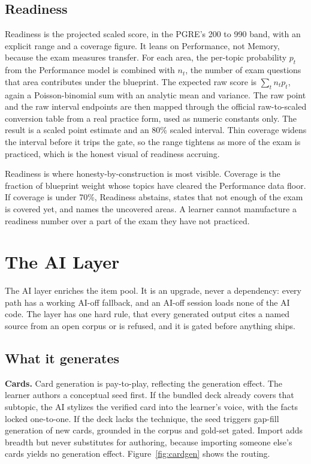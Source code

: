 \documentclass[11pt]{article}
\begin{document}
\subsection{Readiness}

Readiness is the projected scaled score, in the PGRE's 200 to 990 band, with an
explicit range and a coverage figure. It leans on Performance, not Memory, because
the exam measures transfer. For each area, the per-topic probability $p_t$ from the
Performance model is combined with $n_t$, the number of exam questions that area
contributes under the blueprint. The expected raw score is $\sum_t n_t p_t$, again a
Poisson-binomial sum with an analytic mean and variance. The raw point and the raw
interval endpoints are then mapped through the official raw-to-scaled conversion table
from a real practice form, used as numeric constants only. The result is a scaled
point estimate and an 80\% scaled interval. Thin coverage widens the interval before it
trips the gate, so the range tightens as more of the exam is practiced, which is the
honest visual of readiness accruing.

Readiness is where honesty-by-construction is most visible. Coverage is the fraction
of blueprint weight whose topics have cleared the Performance data floor. If coverage
is under 70\%, Readiness abstains, states that not enough of the exam is covered yet,
and names the uncovered areas. A learner cannot manufacture a readiness number over a
part of the exam they have not practiced.

\section{The AI Layer}

The AI layer enriches the item pool. It is an upgrade, never a dependency: every path
has a working AI-off fallback, and an AI-off session loads none of the AI code. The
layer has one hard rule, that every generated output cites a named source from an
open corpus or is refused, and it is gated before anything ships.

\subsection{What it generates}

\textbf{Cards.} Card generation is pay-to-play, reflecting the generation effect. The
learner authors a conceptual seed first. If the bundled deck already covers that
subtopic, the AI stylizes the verified card into the learner's voice, with the facts
locked one-to-one. If the deck lacks the technique, the seed triggers gap-fill
generation of new cards, grounded in the corpus and gold-set gated. Import adds
breadth but never substitutes for authoring, because importing someone else's cards
yields no generation effect. Figure~\ref{fig:cardgen} shows the routing.
\end{document}
